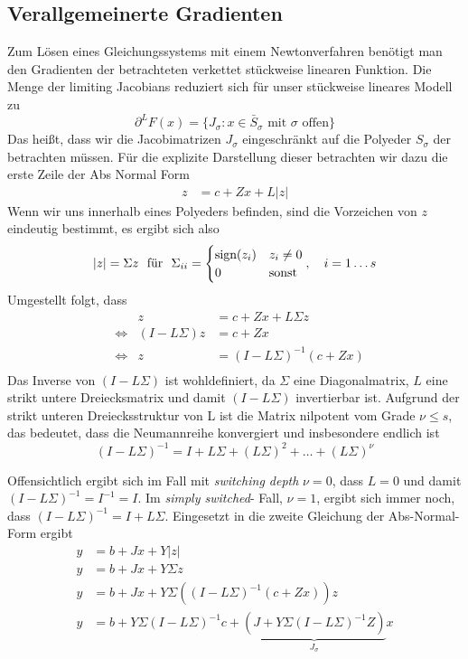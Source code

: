 \subsection{Verallgemeinerte Gradienten}

Zum Lösen eines Gleichungssystems mit einem Newtonverfahren benötigt man den Gradienten der betrachteten verkettet stückweise linearen Funktion. 
Die Menge der limiting Jacobians reduziert sich für unser stückweise lineares Modell zu 
\[
 \partial^L F(x) = \lbrace J_\sigma: x\in \bar S_\sigma \text{ mit }\sigma \text{ offen} \rbrace
\]
Das heißt, dass wir die Jacobimatrizen $J_\sigma$ eingeschränkt auf die Polyeder $S_\sigma$ der betrachten müssen.
Für die explizite Darstellung dieser betrachten wir dazu die erste Zeile der Abs Normal Form
\begin{align*}
	z &= c+ Zx + L|z|
\end{align*}
Wenn wir uns innerhalb eines Polyeders befinden, sind die Vorzeichen von $z$ eindeutig bestimmt, es ergibt sich also  
\begin{align*}
|z| = \Sigma z~ \text{ für }~\Sigma_{ii} =\begin{cases} 
\text{sign}(z_i) & z_i\neq 0\\
0 & \text{sonst}
 \end{cases},\quad i=1\ldots s
\end{align*}
Umgestellt folgt, dass 
\begin{align*}
&&z &= c+ Zx + L\Sigma z\\
&\iff & (I-L\Sigma)z &= c+ Zx \\
&\iff & z &= (I-L\Sigma)^{-1}(c+ Zx)\\
\end{align*}
Das Inverse von $(I-L\Sigma)$ ist wohldefiniert, da $\Sigma$ eine Diagonalmatrix, $L$ eine strikt untere Dreiecksmatrix und damit $(I-L\Sigma)$ invertierbar ist. 
Aufgrund der strikt unteren Dreiecksstruktur von L ist die Matrix nilpotent vom Grade $\nu\leq s$, das bedeutet, dass die Neumannreihe konvergiert und insbesondere endlich ist
\[
(I-L\Sigma)^{-1} = I+L\Sigma + (L\Sigma)^2 + \ldots + (L\Sigma)^{\nu}
\] 

Offensichtlich ergibt sich im Fall mit \textit{switching depth} $\nu = 0$, dass $L=0$ und damit $(I-L\Sigma)^{-1} = I^{-1} = I$. Im \textit{simply switched}- Fall, $\nu=1$, ergibt sich immer noch, dass $(I-L\Sigma)^{-1} =I+L\Sigma$.
Eingesetzt in die zweite Gleichung der Abs-Normal-Form ergibt
\begin{align*}
y &= b+Jx + Y|z|\\
y &= b+Jx + Y\Sigma z\\
y &= b+ Jx + Y\Sigma ((I-L\Sigma)^{-1}(c+ Zx))z\\
y &= b + Y\Sigma(I-L\Sigma)^{-1}c+\underbrace{(J+Y\Sigma(I-L\Sigma)^{-1}Z)}_{J_\sigma}x \\
\end{align*}

